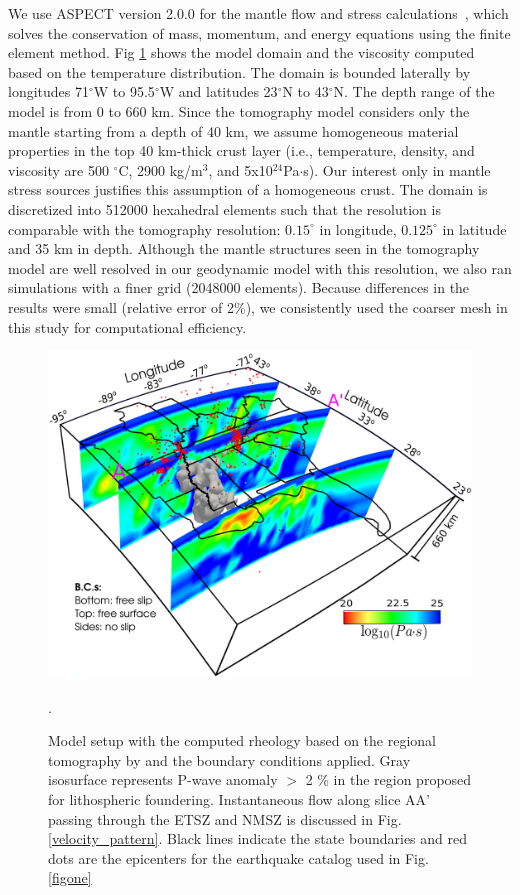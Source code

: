 \documentclass[draft,linenumbers]{agujournal2018}
\begin{document}
    We use ASPECT version 2.0.0 for the mantle flow and stress calculations~\citep{heister_aspect_methods2,KHB12,aspect-doi-v2.0.0}, which solves the conservation of mass, momentum, and energy equations using the finite element method. Fig \ref{fig_model} shows the model domain and the viscosity computed based on the temperature distribution. The domain is bounded laterally by longitudes 71$^\circ$W to 95.5$^\circ$W and latitudes 23$^\circ$N to 43$^\circ$N. The depth range of the model is from 0 to 660 km. Since the tomography model considers only the mantle starting from a depth of 40 km, we assume homogeneous material properties in the top 40 km-thick crust layer (i.e., temperature, density, and viscosity are 500 $^{\circ}$C, 2900 kg/m$^{3}$, and 5x10$^{24}$Pa$\cdot$s). Our interest only in mantle stress sources justifies this assumption of a homogeneous crust. The domain is discretized into 512000 hexahedral elements such that the resolution is comparable with the tomography resolution: $0.15^\circ$ in longitude, $0.125^\circ$ in latitude and 35 km in depth. Although the mantle structures seen in the tomography model are well resolved in our geodynamic model with this resolution, we also ran simulations with a finer grid (2048000 elements). Because differences in the results were small (relative error of 2\%), we consistently used the coarser mesh in this study for computational efficiency.
%
\begin{figure}[ht]
    \centering
    \includegraphics[width=0.75\linewidth]{figures/model_figure.png}
    \caption{Model setup with the computed rheology based on the regional tomography by \citet{Biryol_2016} and the boundary conditions applied. Gray isosurface represents P-wave anomaly $>$ 2 \% in the region proposed for lithospheric foundering. Instantaneous flow along slice AA' passing through the ETSZ and NMSZ is discussed in Fig. \ref{velocity_pattern}. Black lines indicate the state boundaries and red dots are the epicenters for the earthquake catalog used in Fig. \ref{figone}}.
    \label{fig_model}
 \end{figure}
    
\end{document}

